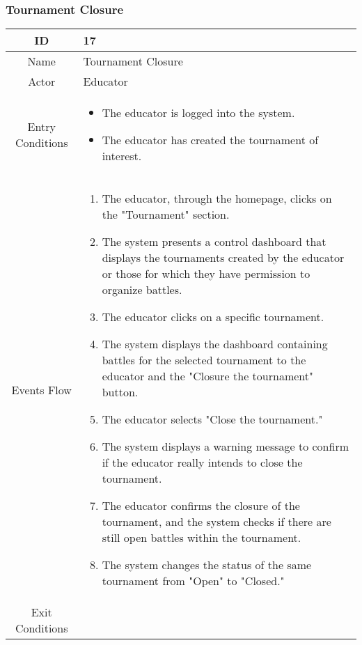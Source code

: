 \subsubsection{Tournament Closure}
\begin{longtable}{|c| p{10cm}|}
        \hline
            ID & 17 \\
        \hline
            Name & Tournament Closure \\
        \hline
            Actor & Educator\\
        \hline
            Entry Conditions &
            \begin{itemize}
                \item The educator is logged into the system.
                \item The educator has created the tournament of interest.
            \end{itemize}\\
        \hline
            Events Flow &   \begin{enumerate}
                            \item The educator, through the homepage, clicks on the "Tournament" section.
                            \item The system presents a control dashboard that displays the tournaments created by the educator or those for which they have permission to organize battles.
                            \item The educator clicks on a specific tournament.
                            \item The system displays the dashboard containing battles for the selected tournament to the educator and the "Closure the tournament" button.
                            \item The educator selects "Close the tournament."
                            \item The system displays a warning message to confirm if the educator really intends to close the tournament.
                            \item The educator confirms the closure of the tournament, and the system checks if there are still open battles within the tournament.
                            \item The system changes the status of the same tournament from "Open" to "Closed."
                            \end{enumerate} \\
                            \hline
            Exit Conditions &

\end{longtable}
